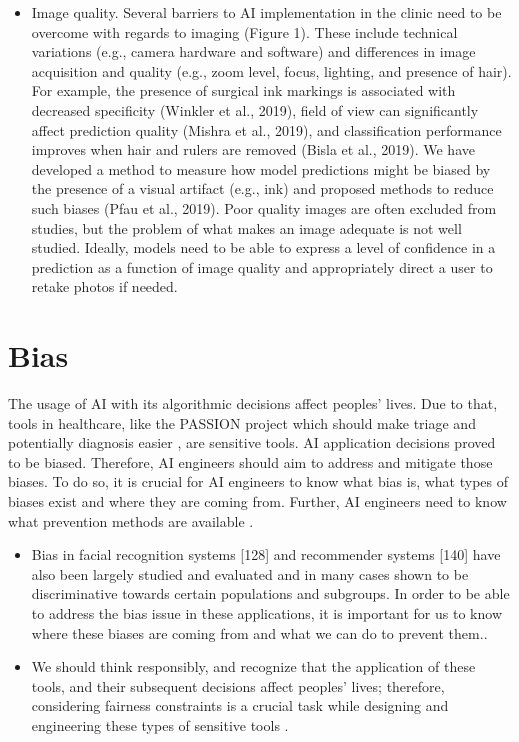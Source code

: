 \documentclass[12pt, a4paper, oneside]{book}   	%
\newif\ifrawcitationactive
\newcommand{\rawcitationend}{\color{black}\rawcitationactivefalse}
\newcommand{\rawcitationusedstart}{\color{violet}}
\newcommand{\rawcitationusedend}{%
	\ifrawcitationactive
	\color{purple}  %
	\else
	\color{black}  %
	\fi
}
\begin{document}
\begin{itemize}
					\item Image quality. Several barriers to AI implementation in the clinic need to be overcome with regards to imaging (Figure 1). These include technical variations (e.g., camera hardware and software) and differences in image acquisition and quality (e.g., zoom level, focus, lighting, and presence of hair). For example, the presence of surgical ink markings is associated with decreased specificity (Winkler et al., 2019), field of view can significantly affect prediction quality (Mishra et al., 2019), and classification performance improves when hair and rulers are removed (Bisla et al., 2019). We have developed a method to measure how model predictions might be biased by the presence of a visual artifact (e.g., ink) and proposed methods to reduce such biases (Pfau et al., 2019). Poor quality images are often excluded from studies, but the problem of what makes an image adequate is not well studied. Ideally, models need to be able to express a level of confidence in a prediction as a function of image quality and appropriately direct a user to retake photos if needed. \autocite{Young_2020}
				\end{itemize}
				\rawcitationend
		
		
		\section{Bias}
		The usage of AI with its algorithmic decisions affect peoples' lives. Due to that, tools in healthcare, like the PASSION project which should make triage and potentially diagnosis easier \autocite{Gottfrois2024}, are sensitive tools. AI application decisions proved to be biased. Therefore, AI engineers should aim to address and mitigate those biases. To do so, it is crucial for AI engineers to know what bias is, what types of biases exist and where they are coming from. Further, AI engineers need to know what prevention methods are available \autocite{Mehrabi_2021}.
			
		\rawcitationusedstart
		\begin{itemize}
				\item Bias in facial recognition systems [128] and recommender systems [140] have also been largely studied and evaluated and in many cases shown to be discriminative towards certain populations and subgroups. In order to be able to address the bias issue in these applications, it is important for us to know where these biases are coming from and what we can do to prevent them.\autocite{Mehrabi_2021}.
				\item We should think responsibly, and recognize that the application of these tools, and their subsequent decisions affect peoples’ lives; therefore, considering fairness constraints is a crucial task while designing and engineering these types of sensitive tools \autocite{Mehrabi_2021}.
		\end{itemize}
		\rawcitationusedend
		
\end{document}

